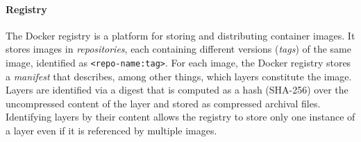 

\paragraph{Registry}
%
The Docker registry is a platform for storing and distributing container images.
%
It stores images in \emph{repositories}, each containing different versions (\emph{tags}) of
the same image, identified as \texttt{<repo-name:tag>}.
%
For each image, the Docker registry stores a \emph{manifest} that describes,
among other things, which layers constitute the image.
%
%
Layers are identified via a digest that is computed as a hash (SHA-256)
over the uncompressed content of the layer and stored as compressed archival files.
%
%
%
%
%
%
%
Identifying layers by their content allows the registry to store only one instance
of a layer even if it is referenced by multiple images.
%
%
%


